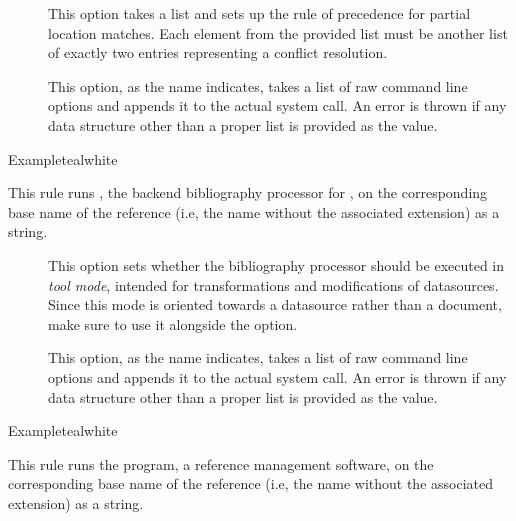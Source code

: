 \begin{description}
\begin{description}
\item[] This option takes a list and sets up the rule of precedence for partial location matches. Each element from the provided list must be another list of exactly two entries representing a conflict resolution.

\item[] This option, as the name indicates, takes a list of raw command line options and appends it to the actual system call. An error is thrown if any data structure other than a proper list is provided as the value.
\end{description}

\begin{codebox}{Example}{teal}{\icnote}{white}
\end{codebox}

\item[\rulebox{biber}]
This rule runs , the backend bibliography processor for , on the corresponding base name of the  reference (i.e, the name without the associated extension) as a string.

\begin{description}
\item[]  This option sets whether the bibliography processor should be executed in \emph{tool mode}, intended for transformations and modifications of datasources. Since this mode is oriented towards a datasource rather than a document, make sure to use it alongside the  option.

\item[] This option, as the name indicates, takes a list of raw command line options and appends it to the actual system call. An error is thrown if any data structure other than a proper list is provided as the value.
\end{description}

\begin{codebox}{Example}{teal}{\icnote}{white}
\end{codebox}

\item[\rulebox{bibtex}]
This rule runs the  program, a reference management software, on the corresponding base name of the  reference (i.e, the name without the associated extension) as a string.


\end{description}
